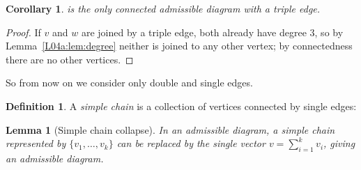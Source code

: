 \documentclass[11pt,openany]{book}
\theoremstyle{plain}
\newtheorem{lemma}[theorem]{Lemma}
\newtheorem{corollary}[theorem]{Corollary}
\theoremstyle{definition}
\newtheorem{definition}[theorem]{Definition}
\theoremstyle{remark}
\newcommand{\added}[1]{{\color{addcol}#1}}
\begin{document}
\begin{corollary}\label{L04a:cor:G2}
 is the only connected admissible diagram with a
triple edge.
\end{corollary}

\begin{proof}[\added{Proof}]
\added{If $v$ and $w$ are joined by a triple edge, both already have degree $3$, so by
Lemma~\ref{L04a:lem:degree} neither is joined to any other vertex; by connectedness there are no
other vertices.}
\end{proof}

So from now on we consider only double and single edges.

\begin{definition}\label{L04a:def:chain}
A \emph{simple chain} is a collection of vertices connected by single edges:
\begin{center}
\end{center}
\end{definition}

\begin{lemma}[Simple chain collapse]\label{L04a:lem:collapse}
In an admissible diagram, a simple chain represented by $\{v_1,\dots,v_k\}$ can be replaced by the single
vector $v=\sum_{i=1}^k v_i$, giving an admissible diagram.
\end{lemma}
\end{document}
